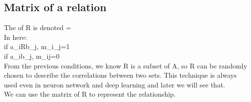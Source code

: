 \documentclass{article}
\begin{document}
\subsection{Matrix of a relation}
The  of R is denoted   = \left[m_{i}_{j}\right]\\
In here:\\ 
if a_{i}Rb_{j}, m_{i}_{j}=1\\
if a_{i}b_{j}, m_{i}{j}=0\\
From the previous conditions, we know R is a subset of A\timesB, so R can be randomly chosen to describe the correlations between two sets. This technique is always used even in neuron network and deep learning and later we will see that. \\
We can use the matrix of R to represent the relationship.\\
\end{document}
